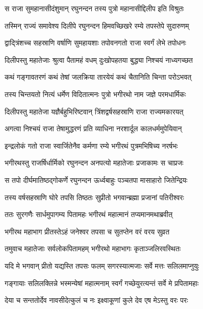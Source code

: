 \twolineshloka
{स राजा सुमहानासीदंशुमान् रघुनन्दन}
{तस्य पुत्रो महानासीद्दिलीप इति विश्रुतः} %

\twolineshloka
{तस्मिन् राज्यं समावेश्य दिलीपे रघुनन्दन}
{हिमवच्छिखरे रम्ये तपस्तेपे सुदारुणम्} %

\twolineshloka
{द्वाद्त्रिंशच्च सहस्राणि वर्षाणि सुमहायशाः}
{तपोवनगतो राजा स्वर्गं लेभे तपोधनः} %

\twolineshloka
{दिलीपस्तु महातेजाः श्रुत्वा पैतामहं वधम्}
{दुःखोपहतया बुद्ध्या निश्चयं नाध्यगच्छत} %

\twolineshloka
{कथं गङ्गावतरणं कथं तेषां जलक्रिया}
{तारयेयं कथं चैतानिति चिन्ता परोऽभवत्} %

\twolineshloka
{तस्य चिन्तयतो नित्यं धर्मेण विदितात्मनः}
{पुत्रो भगीरथो नाम जज्ञे परमधार्मिकः} %

\twolineshloka
{दिलीपस्तु महातेजा यज्ञैर्बहुभिरिष्टवान्}
{त्रिंशद्वर्षसहस्राणि राजा राज्यमकारयत्} %

\twolineshloka
{अगत्वा निश्चयं राजा तेषामुद्धरणं प्रति}
{व्याधिना नरशार्दूल कालधर्ममुपेयिवान्} %

\twolineshloka
{इन्द्रलोकं गतो राजा स्वार्जितेनैव कर्मणा}
{रम्ये भगीरथं पुत्रमभिषिच्य नरर्षभः} %

\twolineshloka
{भगीरथस्तु राजर्षिर्धार्मिको रघुनन्दन}
{अनपत्यो महातेजाः प्रजाकामः स चाप्रजः} %

\twolineshloka
{स तपो दीर्घमातिष्ठद्गोकर्णे रघुनन्दन}
{ऊर्ध्वबाहुः पञ्चतपा मासाहारो जितेन्द्रियः} %

\twolineshloka
{तस्य वर्षसहस्राणि घोरे तपसि तिष्ठतः}
{सुप्रीतो भगवान्ब्रह्मा प्रजानां पतिरीश्वरः} %

\twolineshloka
{ततः सुरगणैः सार्धमुपागम्य पितामहः}
{भगीरथं महात्मानं तप्यमानमथाब्रवीत्} %

\twolineshloka
{भगीरथ महाभाग प्रीतस्तेऽहं जनेश्वर}
{तपसा च सुतप्तेन वरं वरय सुव्रत} %

\twolineshloka
{तमुवाच महातेजाः सर्वलोकपितामहम्}
{भगीरथो महाभागः कृताञ्जलिरवस्थितः} %

\twolineshloka
{यदि मे भगवान् प्रीतो यद्यस्ति तपसः फलम्}
{सगरस्यात्मजाः सर्वे मत्तः सलिलमाप्नुयुः} %

\twolineshloka
{गङ्गायाः सलिलक्लिन्ने भस्मन्येषां महात्मनाम्}
{स्वर्गं गच्छेयुरत्यन्तं सर्वे मे प्रपितामहाः} %

\twolineshloka
{देया च सन्ततोर्देव नावसीदेत्कुलं च नः}
{इक्ष्वाकूणां कुले देव एष मेऽस्तु वरः परः} %

